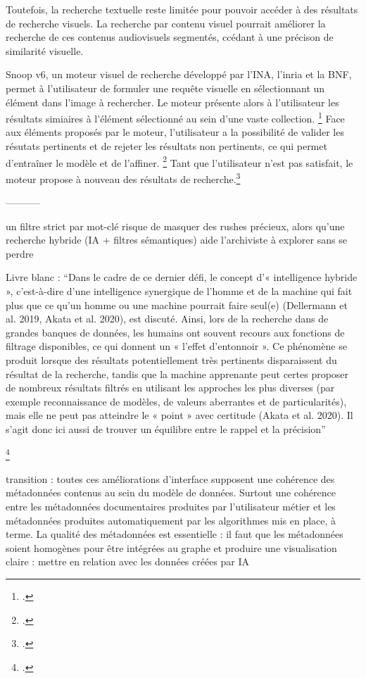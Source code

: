 Toutefois, la recherche textuelle reste limitée pour pouvoir accéder à des résultats de recherche visuels. La recherche par contenu visuel pourrait améliorer la recherche de ces contenus audiovisuels segmentés, ccédant à une précison de similarité visuelle. 

Snoop v6, un moteur visuel de recherche développé par l'INA, l'inria et la BNF, permet à l'utilisateur de formuler une requête visuelle en sélectionnant un élément dans l'image à rechercher. Le moteur présente alors à l'utilisateur les résultats simiaires à l'élément sélectionné au sein d'une vaste collection. \footcite{zotero-item-744} Face aux éléments proposés par le moteur, l'utilisateur a la possibilité de valider les résutats pertinents et de rejeter les résultats non pertinents, ce qui permet d'entraîner le modèle et de l'affiner. \footcite{zotero-item-744} Tant que l'utilisateur n'est pas satisfait, le moteur propose à nouveau des résultats de recherche.\footcite{zotero-item-744}





-----------

un filtre strict par mot-clé risque de masquer des rushes précieux, alors qu'une recherche hybride (IA + filtres sémantiques) aide l'archiviste à explorer sans se perdre

Livre blanc : “Dans le cadre de ce dernier défi, le concept d’« intelligence hybride », c'est-à-dire d'une intelligence synergique de l'homme et de la machine qui fait plus que ce qu'un homme ou une machine pourrait faire seul(e) (Dellermann et al. 2019, Akata et al. 2020), est discuté. Ainsi, lors de la recherche dans de grandes banques de données, les humains ont souvent recours aux fonctions de filtrage disponibles, ce qui donnent un « l'effet d'entonnoir ». Ce phénomène se produit lorsque des résultats potentiellement très pertinents disparaissent du résultat de la recherche, tandis que la machine apprenante peut certes proposer de nombreux résultats filtrés en utilisant les approches les plus diverses (par exemple reconnaissance de modèles, de valeurs aberrantes et de particularités), mais elle ne peut pas atteindre le « point » avec certitude (Akata et al. 2020). Il s'agit donc ici aussi de trouver un équilibre entre le rappel et la précision” 

\footcite{zotero-item-584}

transition : toutes ces améliorations d'interface supposent une cohérence des métadonnées contenus au sein du modèle de données. Surtout une cohérence entre les métadonnées documentaires produites par l'utilisateur métier et les métadonnées produites automatiquement par les algorithmes mis en place, à terme. 
La qualité des métadonnées est essentielle : il faut que les métadonnées soient homogènes pour être intégrées au graphe et produire une visualisation claire : mettre en relation avec les données créées par IA 